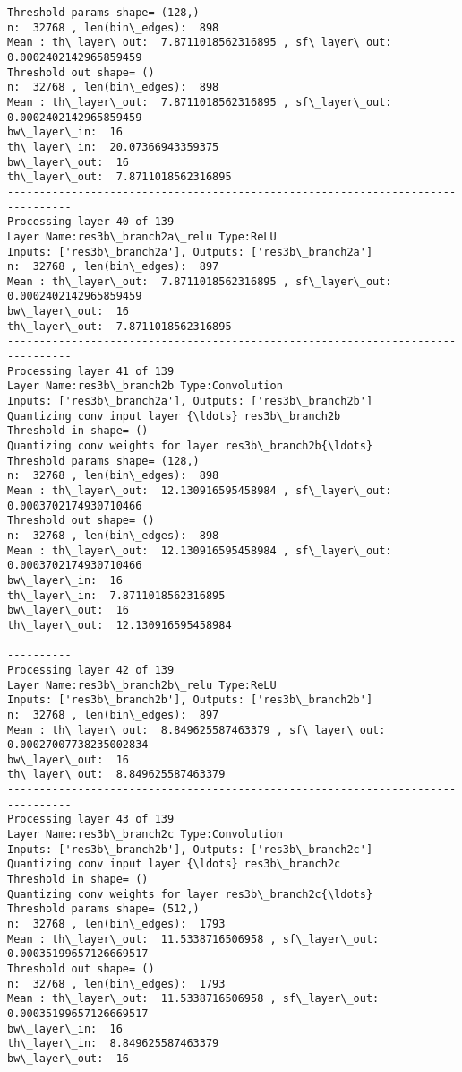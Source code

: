 \documentclass[11pt]{article}
\begin{document}
\begin{Verbatim}[commandchars=\\\{\}]
Threshold params shape= (128,)
n:  32768 , len(bin\_edges):  898
Mean : th\_layer\_out:  7.8711018562316895 , sf\_layer\_out:  0.0002402142965859459
Threshold out shape= ()
n:  32768 , len(bin\_edges):  898
Mean : th\_layer\_out:  7.8711018562316895 , sf\_layer\_out:  0.0002402142965859459
bw\_layer\_in:  16
th\_layer\_in:  20.07366943359375
bw\_layer\_out:  16
th\_layer\_out:  7.8711018562316895
--------------------------------------------------------------------------------
Processing layer 40 of 139
Layer Name:res3b\_branch2a\_relu Type:ReLU
Inputs: ['res3b\_branch2a'], Outputs: ['res3b\_branch2a']
n:  32768 , len(bin\_edges):  897
Mean : th\_layer\_out:  7.8711018562316895 , sf\_layer\_out:  0.0002402142965859459
bw\_layer\_out:  16
th\_layer\_out:  7.8711018562316895
--------------------------------------------------------------------------------
Processing layer 41 of 139
Layer Name:res3b\_branch2b Type:Convolution
Inputs: ['res3b\_branch2a'], Outputs: ['res3b\_branch2b']
Quantizing conv input layer {\ldots} res3b\_branch2b
Threshold in shape= ()
Quantizing conv weights for layer res3b\_branch2b{\ldots}
Threshold params shape= (128,)
n:  32768 , len(bin\_edges):  898
Mean : th\_layer\_out:  12.130916595458984 , sf\_layer\_out:  0.0003702174930710466
Threshold out shape= ()
n:  32768 , len(bin\_edges):  898
Mean : th\_layer\_out:  12.130916595458984 , sf\_layer\_out:  0.0003702174930710466
bw\_layer\_in:  16
th\_layer\_in:  7.8711018562316895
bw\_layer\_out:  16
th\_layer\_out:  12.130916595458984
--------------------------------------------------------------------------------
Processing layer 42 of 139
Layer Name:res3b\_branch2b\_relu Type:ReLU
Inputs: ['res3b\_branch2b'], Outputs: ['res3b\_branch2b']
n:  32768 , len(bin\_edges):  897
Mean : th\_layer\_out:  8.849625587463379 , sf\_layer\_out:  0.00027007738235002834
bw\_layer\_out:  16
th\_layer\_out:  8.849625587463379
--------------------------------------------------------------------------------
Processing layer 43 of 139
Layer Name:res3b\_branch2c Type:Convolution
Inputs: ['res3b\_branch2b'], Outputs: ['res3b\_branch2c']
Quantizing conv input layer {\ldots} res3b\_branch2c
Threshold in shape= ()
Quantizing conv weights for layer res3b\_branch2c{\ldots}
Threshold params shape= (512,)
n:  32768 , len(bin\_edges):  1793
Mean : th\_layer\_out:  11.5338716506958 , sf\_layer\_out:  0.00035199657126669517
Threshold out shape= ()
n:  32768 , len(bin\_edges):  1793
Mean : th\_layer\_out:  11.5338716506958 , sf\_layer\_out:  0.00035199657126669517
bw\_layer\_in:  16
th\_layer\_in:  8.849625587463379
bw\_layer\_out:  16

\end{Verbatim}
\end{document}
